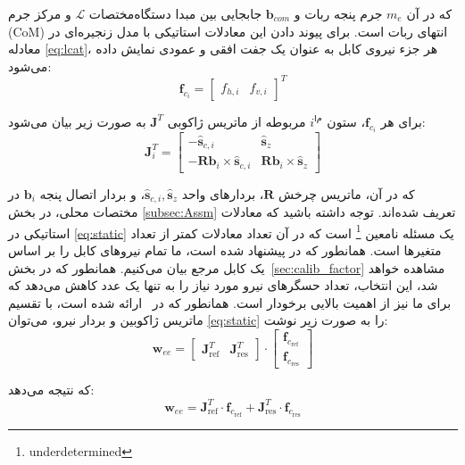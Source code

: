 که در آن $m_e$ جرم پنجه ربات و $\bm{b}_{com}$ جابجایی بین مبدا دستگاه‌مختصات $\mathcal{L}$ و مرکز جرم (CoM) انتهای ربات است. 
برای پیوند دادن این معادلات استاتیکی با مدل زنجیره‌ای در معادله \eqref{eq:lcat}، هر جزء نیروی کابل به عنوان یک جفت افقی و عمودی نمایش داده می‌شود:  
\begin{equation}
	\mathbf{f}_{c_{i}}= \begin{bmatrix} f_{h,i} & f_{v,i} \end{bmatrix} ^T 
\end{equation}

برای هر $\mathbf{f}_{c_{i}}$، ستون $i^{ام}$ مربوطه از ماتریس ژاکوبی $\bm{J}^T$ به صورت زیر بیان می‌شود:
\begin{equation}
	\bm{J}^T_i= \begin{bmatrix} -\hat{\bm{s}}_{c,i} & \hat{\bm{s}}_{z} \\ -\bm{R}\bm{b}_{i} \times \hat{\bm{s}}_{c,i} & \bm{R}\bm{b}_{i} \times \hat{\bm{s}}_{z}  \end{bmatrix}
\end{equation}

که در آن، ماتریس چرخش $\bm{R}$، بردارهای واحد $\hat{\bm{s}}_{c,i}, \hat{\bm{s}}_{z}$، و بردار اتصال پنجه $\bm{b}_i$ در مختصات محلی، در بخش
\ref{subsec:Assm} 
تعریف شده‌اند. توجه داشته باشید که معادلات استاتیکی در 
\ref{eq:static}
 یک مسئله نامعین
 \footnote{underdetermined}
است که در آن تعداد معادلات کمتر از تعداد متغیرها است. همانطور که در \cite{allak2022kinematics} پیشنهاد شده است، ما تمام نیروهای کابل را بر اساس یک کابل مرجع بیان می‌کنیم. همانطور که در بخش~\ref{sec:calib_factor} مشاهده خواهد شد، این انتخاب، تعداد حسگرهای نیرو مورد نیاز را به تنها یک عدد کاهش می‌دهد که برای ما نیز از اهمیت بالایی برخودار است. همانطور که در~\cite{borgstrom2009nims, allak2022kinematics} ارائه شده است، با تقسیم ماتریس ژاکوبین و بردار نیرو، می‌توان
 \ref{eq:static} 
 را به صورت زیر نوشت:
\begin{equation} \label{eq:wrench-jac-force}
	\mathbf{w}_{ee} = \begin{bmatrix} \bm{J}^T_{\text{ref}} & \bm{J}^T_{\text{res}} \end{bmatrix} \cdot \begin{bmatrix} \mathbf{f}_{c_{\text{ref}}} \\ \mathbf{f}_{c_{\text{res}}} \end{bmatrix} 
\end{equation} 

که نتیجه می‌دهد:
\begin{equation} \label{eq:jacobian-distribution}
	\mathbf{w}_{ee} = \bm{J}_{\text{ref}}^T \cdot \mathbf{f}_{c_{\text{ref}}} + \bm{J}_{\text{res}}^T \cdot \mathbf{f}_{c_{\text{res}}} 
\end{equation}

